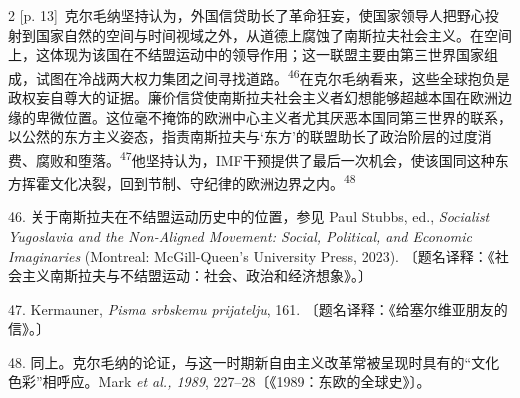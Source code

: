 \documentclass[10pt,a4paper]{article}
\begin{document}
\begin{paracol}{2}
{\scriptsize\color{gray} [p. 13]}\ 克尔毛纳坚持认为，外国信贷助长了革命狂妄，使国家领导人把野心投射到国家自然的空间与时间视域之外，从道德上腐蚀了南斯拉夫社会主义。在空间上，这体现为该国在不结盟运动中的领导作用；这一联盟主要由第三世界国家组成，试图在冷战两大权力集团之间寻找道\mbox{路。\textsuperscript{46}}在克尔毛纳看来，这些全球抱负是政权妄自尊大的证据。廉价信贷使南斯拉夫社会主义者幻想能够超越本国在欧洲边缘的卑微位置。这位毫不掩饰的欧洲中心主义者尤其厌恶本国同第三世界的联系，以公然的东方主义姿态，指责南斯拉夫与‘东方’的联盟助长了政治阶层的过度消费、腐败和堕\mbox{落。\textsuperscript{47}}他坚持认为，IMF干预提供了最后一次机会，使该国同这种东方挥霍文化决裂，回到节制、守纪律的欧洲边界之\mbox{内。\textsuperscript{48}}\par{\small 46. 关于南斯拉夫在不结盟运动历史中的位置，参见 Paul Stubbs, ed., \textit{Socialist Yugoslavia and the Non-Aligned Movement: Social, Political, and Economic Imaginaries} (Montreal: McGill-Queen’s University Press, 2023). 〔题名译释：《社会主义南斯拉夫与不结盟运动：社会、政治和经济想象》。〕\par}{\small 47. Kermauner, \textit{Pisma srbskemu prijatelju}, 161. 〔题名译释：《给塞尔维亚朋友的信》。〕\par}{\small 48. 同上。克尔毛纳的论证，与这一时期新自由主义改革常被呈现时具有的“文化色彩”相呼应。Mark \textit{et al., 1989}, 227–28〔《1989：东欧的全球史》〕。\par}
\switchcolumn

\end{paracol}
\end{document}
